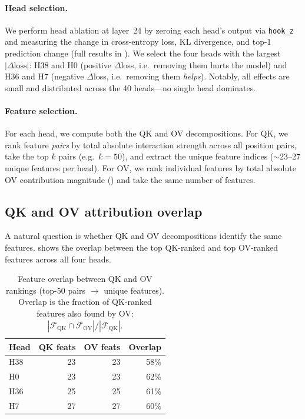 \documentclass{article}
\theoremstyle{plain}
\theoremstyle{definition}
\theoremstyle{remark}
\begin{document}
\paragraph{Head selection.} We perform head ablation at layer~24 by zeroing each head's output via \texttt{hook\_z} and measuring the change in cross-entropy loss, KL divergence, and top-1 prediction change (full results in ). We select the four heads with the largest $|\Delta\text{loss}|$: H38 and H0 (positive $\Delta$loss, i.e.\ removing them hurts the model) and H36 and H7 (negative $\Delta$loss, i.e.\ removing them \emph{helps}). Notably, all effects are small and distributed across the 40 heads---no single head dominates.

\paragraph{Feature selection.} For each head, we compute both the QK and OV decompositions. For QK, we rank feature \emph{pairs} by total absolute interaction strength across all position pairs, take the top $k$ pairs (e.g.\ $k{=}50$), and extract the unique feature indices (${\sim}23$--27 unique features per head). For OV, we rank individual features by total absolute OV contribution magnitude () and take the same number of features.

\subsection{QK and OV attribution overlap}
\label{sec:overlap}

A natural question is whether QK and OV decompositions identify the same features.  shows the overlap between the top QK-ranked and top OV-ranked features across all four heads.

\begin{table}[t]
\caption{Feature overlap between QK and OV rankings (top-50 pairs $\to$ unique features). Overlap is the fraction of QK-ranked features also found by OV: $|\mathcal{F}_{\mathrm{QK}} \cap \mathcal{F}_{\mathrm{OV}}| / |\mathcal{F}_{\mathrm{QK}}|$.}
\label{tab:overlap}
\centering
\small
\begin{tabular}{lrrr}
\toprule
Head & QK feats & OV feats & Overlap \\
\midrule
H38 & 23 & 23 & 58\% \\
H0  & 23 & 23 & 62\% \\
H36 & 25 & 25 & 61\% \\
H7  & 27 & 27 & 60\% \\
\bottomrule
\end{tabular}
\end{table}
\end{document}
